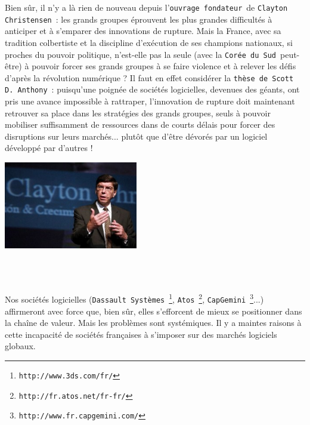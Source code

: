 \documentclass[11pt,twoside,a4paper]{article}
\begin{document}
\begin{minipage}[h]{12.00cm}
	Bien s{\^u}r, il n'y a l{\`a} rien de nouveau depuis l'\texttt{ouvrage fondateur}~\footnotemark de \texttt{Clayton Christensen}~\footnotemark : les grands groupes {\'e}prouvent les plus grandes difficult{\'e}s {\`a} anticiper et {\`a} s'emparer des innovations de rupture. Mais la France, avec sa tradition colbertiste et la discipline d'ex{\'e}cution de ses champions nationaux, si proches du pouvoir politique, n'est-elle pas la seule (avec la \texttt{Cor{\'e}e du Sud}~\footnotemark peut-{\^e}tre) {\`a} pouvoir forcer ses grands groupes {\`a} se faire violence et {\`a} relever les d{\'e}fis d'apr{\`e}s la r{\'e}volution num{\'e}rique ? Il faut en effet consid{\'e}rer la \texttt{th{\`e}se de Scott D. Anthony}~\footnotemark : puisqu'une poign{\'e}e de soci{\'e}t{\'e}s logicielles, devenues des g{\'e}ants, ont pris une avance impossible {\`a} rattraper, l'innovation de rupture doit maintenant retrouver sa place dans les strat{\'e}gies des grands groupes, seuls {\`a} pouvoir mobiliser suffisamment de ressources dans de courts d{\'e}lais pour forcer des disruptions sur leurs march{\'e}s... plut{\^o}t que d'{\^e}tre d{\'e}vor{\'e}s par un logiciel d{\'e}velopp{\'e} par d'autres !
\end{minipage} \hfill \begin{minipage}[h]{6.00cm}
	\includegraphics[width=5.85cm]{img/clayton-christensen-02-300x196.jpg}
\end{minipage} ~\\~\\

Nos soci{\'e}t{\'e}s logicielles (\texttt{Dassault Syst{\`e}mes}~\footnote{\texttt{http://www.3ds.com/fr/}}, \texttt{Atos}~\footnote{\texttt{http://fr.atos.net/fr-fr/}}, \texttt{CapGemini}~\footnote{\texttt{http://www.fr.capgemini.com/}}...) affirmeront avec force que, bien s{\^u}r, elles s'efforcent de mieux se positionner dans la cha{\^i}ne de valeur. Mais les probl{\`e}mes sont syst{\'e}miques. Il y a maintes raisons {\`a} cette incapacit{\'e} de soci{\'e}t{\'e}s fran\c{c}aises {\`a} s'imposer sur des march{\'e}s logiciels globaux. ~\\
\end{document}
